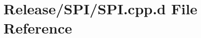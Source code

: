 \hypertarget{_release_2_s_p_i_2_s_p_i_8cpp_8d}{\section{\-Release/\-S\-P\-I/\-S\-P\-I.cpp.\-d \-File \-Reference}
\label{_release_2_s_p_i_2_s_p_i_8cpp_8d}
}
